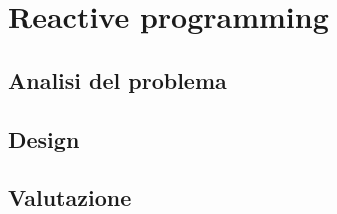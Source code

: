 \documentclass[report]{subfiles}
\begin{document}
	\section{Reactive programming}
	\subsection{Analisi del problema}
	\subsection{Design}
	\subsection{Valutazione}
\end{document}
